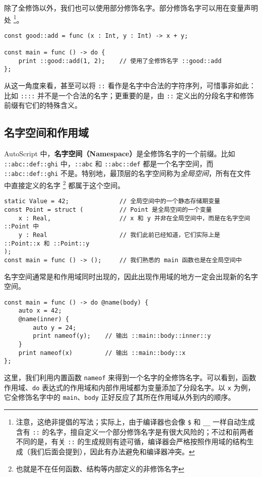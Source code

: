 除了全修饰以外，我们也可以使用部分修饰名字。部分修饰名字可以用在变量声明处 \footnote{注意，这绝非提倡的写法；实际上，由于编译器也会像 \texttt{\$} 和 \texttt{\_\_} 一样自动生成含有 \texttt{::} 的名字，擅自定义一个部分修饰名字是有很大风险的；不过和前两者不同的是，有关 \texttt{::} 的生成规则有迹可循，编译器会严格按照作用域的结构生成（我们后面会提到），因此有办法避免和编译器冲突。}。

\begin{lstlisting}
const good::add = func (x : Int, y : Int) -> x + y;

const main = func () -> do {
	print ::good::add(1, 2);	// 使用了全修饰名字 ::good::add
};
\end{lstlisting}

从这一角度来看，甚至可以将 \texttt{::} 看作是名字中合法的字符序列，可惜事非如此：比如 \texttt{::::} 并不是一个合法的名字；更重要的是，由 \texttt{::} 定义出的分段名字和修饰前缀有它们的特殊含义。

\subsection{名字空间和作用域}

AutoScript 中，\textbf{名字空间（Namespace）}是全修饰名字的一个前缀。比如 \texttt{::abc::def::ghi} 中，\texttt{::abc} 和 \texttt{::abc::def} 都是一个名字空间，而 \texttt{::abc::def::ghi} 不是。特别地，最顶层的名字空间称为\emph{全局空间}，所有在文件中直接定义的名字 \footnote{也就是不在任何函数、结构等内部定义的非修饰名字} 都属于这个空间。

\begin{lstlisting}
static Value = 42;				// 全局空间中的一个静态存储期变量
const Point = struct (			// Point 是全局空间的一个变量
	x : Real,					// x 和 y 并非在全局空间中，而是在名字空间 ::Point 中
	y : Real					// 我们此前已经知道，它们实际上是 ::Point::x 和 ::Point::y
);
const main = func () -> ();		// 我们熟悉的 main 函数也是在全局空间中
\end{lstlisting}

名字空间通常是和作用域同时出现的，因此出现作用域的地方一定会出现新的名字空间。

\begin{lstlisting}
const main = func () -> do @name(body) {
	auto x = 42;
	@name(inner) {
		auto y = 24;
		print nameof(y);	// 输出 ::main::body::inner::y
	}
	print nameof(x)			// 输出 ::main::body::x
};
\end{lstlisting}

这里，我们利用内置函数 \lstinline!nameof! 来得到一个名字的全修饰名字。可以看到，函数作用域、\lstinline!do! 表达式的作用域和内部作用域都为变量添加了分段名字。以 \lstinline!x! 为例，它全修饰名字中的 \lstinline!main!、\lstinline!body! 正好反应了其所在作用域从外到内的顺序。 \\

